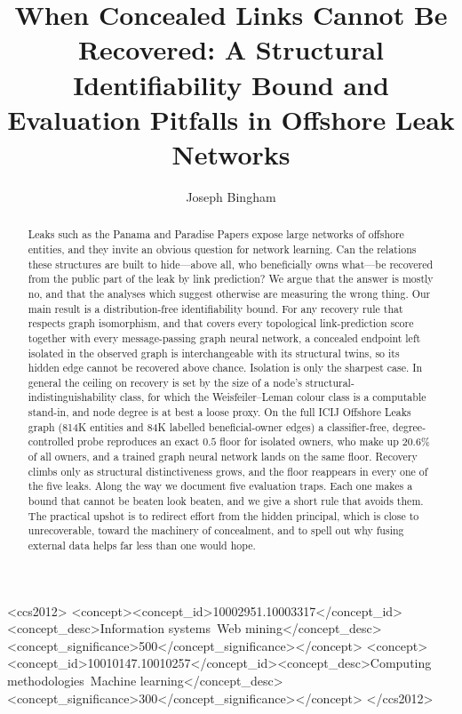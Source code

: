 \documentclass[sigconf]{acmart}
\begin{document}
\title{When Concealed Links Cannot Be Recovered: A Structural
Identifiability Bound and Evaluation Pitfalls in Offshore Leak Networks}

\author{Joseph Bingham}
\renewcommand{\shortauthors}{Bingham}

\begin{abstract}
Leaks such as the Panama and Paradise Papers expose large networks of offshore
entities, and they invite an obvious question for network learning. Can the
relations these structures are built to hide---above all, who beneficially owns
what---be recovered from the public part of the leak by link prediction? We argue
that the answer is mostly no, and that the analyses which suggest otherwise are
measuring the wrong thing. Our main result is a distribution-free identifiability
bound. For any recovery rule that respects graph isomorphism, and that covers
every topological link-prediction score together with every message-passing graph
neural network, a concealed endpoint left isolated in the observed graph is
interchangeable with its structural twins, so its hidden edge cannot be recovered
above chance. Isolation is only the sharpest case. In general the ceiling on
recovery is set by the size of a node's structural-indistinguishability class,
for which the Weisfeiler--Leman colour class is a computable stand-in, and node
degree is at best a loose proxy. On the full ICIJ Offshore Leaks graph (814K
entities and 84K labelled beneficial-owner edges) a classifier-free,
degree-controlled probe reproduces an exact $0.5$ floor for isolated owners,
who make up $20.6\%$ of all owners, and a trained graph neural network lands on
the same floor. Recovery climbs only as structural distinctiveness grows, and the
floor reappears in every one of the five leaks. Along the way we document five
evaluation traps. Each one makes a bound that cannot be beaten look beaten, and we
give a short rule that avoids them. The practical upshot is to redirect effort
from the hidden principal, which is close to unrecoverable, toward the machinery
of concealment, and to spell out why fusing external data helps far less than one
would hope.
\end{abstract}

\begin{CCSXML}
<ccs2012>
<concept><concept_id>10002951.10003317</concept_id><concept_desc>Information systems~Web mining</concept_desc><concept_significance>500</concept_significance></concept>
<concept><concept_id>10010147.10010257</concept_id><concept_desc>Computing methodologies~Machine learning</concept_desc><concept_significance>300</concept_significance></concept>
</ccs2012>
\end{CCSXML}
\end{document}
